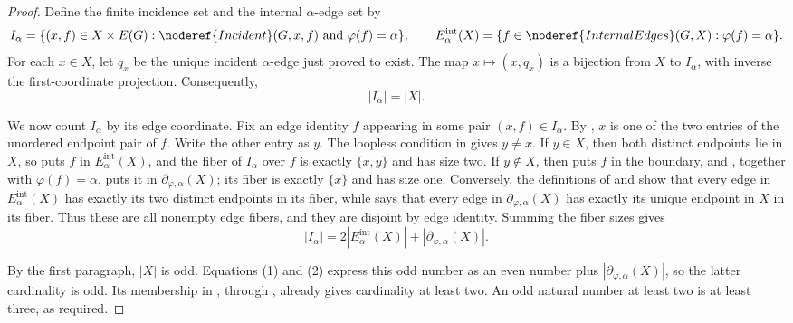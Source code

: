 \begin{proof}
Define the finite incidence set and the internal $\alpha$-edge set by
\[
 I_\alpha=\{(x,f)\in X\times E(G):
      \noderef{Incident}(G,x,f)\ \hbox{and}\ \varphi(f)=\alpha\},
 \qquad
 E^{\mathrm{int}}_\alpha(X)=
 \{f\in\noderef{InternalEdges}(G,X):\varphi(f)=\alpha\}.
\]
For each $x\in X$, let $q_x$ be the unique incident $\alpha$-edge just
proved to exist.  The map $x\mapsto(x,q_x)$ is a bijection from $X$ to
$I_\alpha$, with inverse the first-coordinate projection.  Consequently,
\[
 |I_\alpha|=|X|. \tag{1}
\]

We now count $I_\alpha$ by its edge coordinate.  Fix an edge identity $f$
appearing in some pair $(x,f)\in I_\alpha$.  By , $x$ is
one of the two entries of the unordered endpoint pair of $f$.  Write the
other entry as $y$.  The loopless condition in
 gives $y\ne x$.  If $y\in X$, then both
distinct endpoints lie in $X$, so  puts $f$ in
$E^{\mathrm{int}}_\alpha(X)$, and the fiber of $I_\alpha$ over $f$ is
exactly $\{x,y\}$ and has size two.  If $y\notin X$, then
 puts $f$ in the boundary, and
, together with $\varphi(f)=\alpha$, puts it
in $\partial_{\varphi,\alpha}(X)$; its fiber is exactly $\{x\}$ and has
size one.  Conversely, the definitions of  and
 show that every edge in
$E^{\mathrm{int}}_\alpha(X)$ has exactly its two distinct endpoints in its
fiber, while  says that every edge in
$\partial_{\varphi,\alpha}(X)$ has exactly its unique endpoint in $X$ in
its fiber.  Thus these are all nonempty edge fibers, and they are disjoint
by edge identity.  Summing the fiber sizes gives
\[
 |I_\alpha|
   =2|E^{\mathrm{int}}_\alpha(X)|
      +|\partial_{\varphi,\alpha}(X)|. \tag{2}
\]

By the first paragraph, $|X|$ is odd.  Equations (1) and (2) express this
odd number as an even number plus
$|\partial_{\varphi,\alpha}(X)|$, so the latter cardinality is odd.  Its
membership in , through
, already gives cardinality at least two.  An odd
natural number at least two is at least three, as required.
\end{proof}
